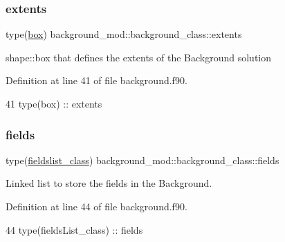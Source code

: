 \subsubsection{\texorpdfstring{extents}{extents}}
{\footnotesize\ttfamily type(\mbox{\hyperlink{structgeometry__mod_1_1box}{box}}) background\+\_\+mod\+::background\+\_\+class\+::extents\hspace{0.3cm}{\ttfamily [private]}}



shape\+::box that defines the extents of the Background solution 



Definition at line 41 of file background.\+f90.


\begin{DoxyCode}
41         \textcolor{keywordtype}{type}(box) :: extents
\end{DoxyCode}
\mbox{\label{structbackground__mod_1_1background__class_a68b750f0476dc75b886638a45a45f8f6}} 
\subsubsection{\texorpdfstring{fields}{fields}}
{\footnotesize\ttfamily type(\mbox{\hyperlink{structbackground__mod_1_1fieldslist__class}{fieldslist\+\_\+class}}) background\+\_\+mod\+::background\+\_\+class\+::fields\hspace{0.3cm}{\ttfamily [private]}}



Linked list to store the fields in the Background. 



Definition at line 44 of file background.\+f90.


\begin{DoxyCode}
44         \textcolor{keywordtype}{type}(fieldsList\_class) :: fields
\end{DoxyCode}
\mbox{\label{structbackground__mod_1_1background__class_a1b3eabdda94ffdb97b6bb0db385edfd8}} 
